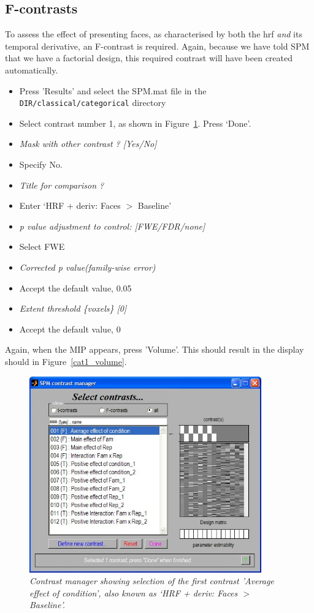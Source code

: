 \documentclass[a4paper,titlepage]{book}
\newcommand{\bi}{\begin{itemize}}
\newcommand{\ei}{\end{itemize}}
\begin{document}
\subsection{F-contrasts}

To assess the effect of presenting faces, as characterised by both the hrf {\em and} its temporal derivative, an F-contrast is required. Again, because we have told SPM that we have a factorial design, this required contrast will have been created automatically. 
\bi
\item{Press 'Results' and select the SPM.mat file in the 
\verb!DIR/classical/categorical! directory}
\item{Select contrast number 1, as shown in Figure~\ref{cat1_contrast}. Press `Done'.}
\item{\em Mask with other contrast ? [Yes/No]}
\item{Specify No.}
\item{\em Title for comparison ?}
\item{Enter `HRF + deriv: Faces $>$ Baseline'}
\item{\em p value adjustment to control: [FWE/FDR/none]}
\item{Select FWE}
\item{\em Corrected p value(family-wise error)}
\item{Accept the default value, 0.05}
\item{\em Extent threshold \{voxels\} [0]}
\item{Accept the default value, 0}
\ei
Again, when the MIP appears, press 'Volume'. This should result in the display should in Figure~\ref{cat1_volume}.
\begin{figure}
\begin{center}
\includegraphics[width=100mm]{cat1_contrast}
\caption{\em Contrast manager showing selection of the first contrast 'Average effect of condition', also known as `HRF + deriv: Faces  $>$ Baseline'. \label{cat1_contrast} }
\end{center}
\end{figure}
\end{document}
